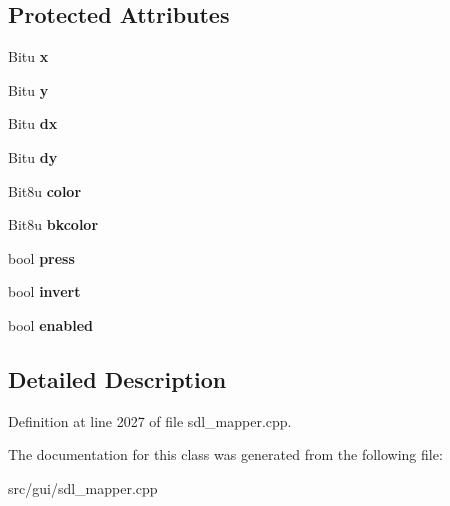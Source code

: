 \subsection*{Protected Attributes}
\begin{DoxyCompactItemize}
\item 
\hypertarget{classCButton_a31c9a5bc0e54382407372236ef0fce68}{Bitu {\bfseries x}}\label{classCButton_a31c9a5bc0e54382407372236ef0fce68}

\item 
\hypertarget{classCButton_a6be6467fc0eb283d33caa042c6c2bfbe}{Bitu {\bfseries y}}\label{classCButton_a6be6467fc0eb283d33caa042c6c2bfbe}

\item 
\hypertarget{classCButton_a0d46295304a83ce1a81fc42056ae3959}{Bitu {\bfseries dx}}\label{classCButton_a0d46295304a83ce1a81fc42056ae3959}

\item 
\hypertarget{classCButton_a6bb4df5cec766a3675bf3365927ff45f}{Bitu {\bfseries dy}}\label{classCButton_a6bb4df5cec766a3675bf3365927ff45f}

\item 
\hypertarget{classCButton_acf415cea0b3968f10393d204a0c4f4ec}{Bit8u {\bfseries color}}\label{classCButton_acf415cea0b3968f10393d204a0c4f4ec}

\item 
\hypertarget{classCButton_a34acf521fa23393acf3aa72b627489e6}{Bit8u {\bfseries bkcolor}}\label{classCButton_a34acf521fa23393acf3aa72b627489e6}

\item 
\hypertarget{classCButton_a30765010fb22b4310b631a20c00be094}{bool {\bfseries press}}\label{classCButton_a30765010fb22b4310b631a20c00be094}

\item 
\hypertarget{classCButton_a8b3db5e11eaef4d5b539493abfcf0db9}{bool {\bfseries invert}}\label{classCButton_a8b3db5e11eaef4d5b539493abfcf0db9}

\item 
\hypertarget{classCButton_a4037c6c6e9cce44e38d21c4f87925193}{bool {\bfseries enabled}}\label{classCButton_a4037c6c6e9cce44e38d21c4f87925193}

\end{DoxyCompactItemize}


\subsection{Detailed Description}


Definition at line 2027 of file sdl\-\_\-mapper.\-cpp.



The documentation for this class was generated from the following file\-:\begin{DoxyCompactItemize}
\item 
src/gui/sdl\-\_\-mapper.\-cpp\end{DoxyCompactItemize}
